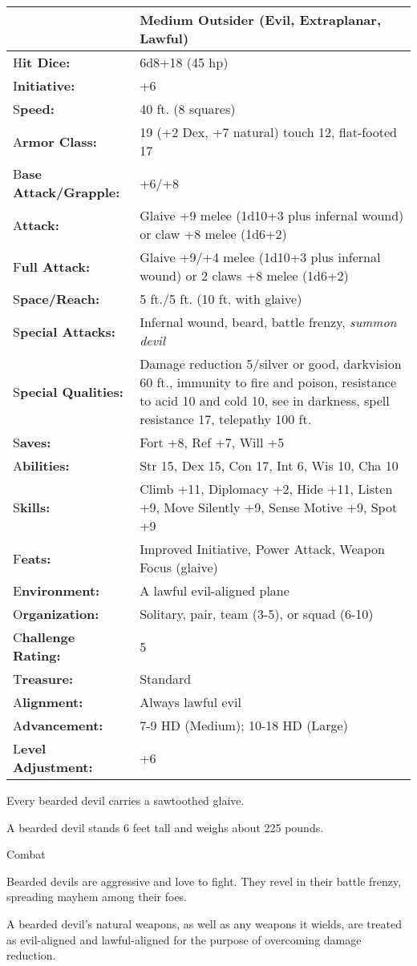 \documentclass{article}
\begin{document}
\begin{tabular}{|>{\raggedright}p{91pt}|>{\raggedright}p{210pt}|}
\hline
  & Medium Outsider (Evil, Extraplanar, Lawful)\tabularnewline
\hline
H\textbf{it Dice:} & 6d8+18 (45 hp)\tabularnewline
\hline
I\textbf{nitiative:} & +6\tabularnewline
\hline
S\textbf{peed:} & 40 ft. (8 squares)\tabularnewline
\hline
A\textbf{rmor Class:} & 19 (+2 Dex, +7 natural) touch 12, flat-footed 17\tabularnewline
\hline
B\textbf{ase Attack/Grapple:} & +6/+8\tabularnewline
\hline
A\textbf{ttack:} & Glaive +9 melee (1d10+3 plus infernal wound) or claw +8 melee 
(1d6+2)\tabularnewline
\hline
F\textbf{ull Attack:} & Glaive +9/+4 melee (1d10+3 plus infernal wound) or 2 claws 
+8 melee (1d6+2)\tabularnewline
\hline
S\textbf{pace/Reach:} & 5 ft./5 ft. (10 ft. with glaive)\tabularnewline
\hline
S\textbf{pecial Attacks:} & Infernal wound, beard, battle frenzy, \textit{summon 
devil}\tabularnewline
\hline
S\textbf{pecial Qualities:} & Damage reduction 5/silver or good, darkvision 60 
ft., immunity to fire and poison, resistance to acid 10 and cold 10, see in darkness, 
spell resistance 17, telepathy 100 ft.\tabularnewline
\hline
S\textbf{aves:} & Fort +8, Ref +7, Will +5\tabularnewline
\hline
A\textbf{bilities:} & Str 15, Dex 15, Con 17, Int 6, Wis 10, Cha 10\tabularnewline
\hline
S\textbf{kills:} & Climb +11, Diplomacy +2, Hide +11, Listen +9, Move Silently 
+9, Sense Motive +9, Spot +9\tabularnewline
\hline
F\textbf{eats:} & Improved Initiative, Power Attack, Weapon Focus (glaive)\tabularnewline
\hline
E\textbf{nvironment:} & A lawful evil-aligned plane\tabularnewline
\hline
O\textbf{rganization:} & Solitary, pair, team (3-5), or squad (6-10)\tabularnewline
\hline
C\textbf{hallenge Rating:} & 5\tabularnewline
\hline
T\textbf{reasure:} & Standard\tabularnewline
\hline
A\textbf{lignment:} & Always lawful evil\tabularnewline
\hline
A\textbf{dvancement:} & 7-9 HD (Medium); 10-18 HD (Large)\tabularnewline
\hline
L\textbf{evel Adjustment:} & +6\tabularnewline
\hline
\end{tabular}

Every bearded devil carries a sawtoothed glaive.

A bearded devil stands 6 feet tall and weighs about 225 pounds.

Combat

Bearded devils are aggressive and love to fight. They revel in their battle frenzy, 
spreading mayhem among their foes. 

A bearded devil's natural weapons, as well as any weapons it wields, are treated 
as evil-aligned and lawful-aligned for the purpose of overcoming damage reduction.
\end{document}
